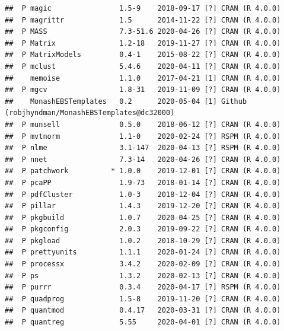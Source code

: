 \documentclass[11pt,a4paper,]{article}
\begin{document}
\begin{verbatim}
##  P magic                1.5-9    2018-09-17 [?] CRAN (R 4.0.0)                                 
##  P magrittr             1.5      2014-11-22 [?] CRAN (R 4.0.0)                                 
##  P MASS                 7.3-51.6 2020-04-26 [?] CRAN (R 4.0.0)                                 
##  P Matrix               1.2-18   2019-11-27 [?] CRAN (R 4.0.0)                                 
##  P MatrixModels         0.4-1    2015-08-22 [?] CRAN (R 4.0.0)                                 
##  P mclust               5.4.6    2020-04-11 [?] CRAN (R 4.0.0)                                 
##    memoise              1.1.0    2017-04-21 [1] CRAN (R 4.0.0)                                 
##  P mgcv                 1.8-31   2019-11-09 [?] CRAN (R 4.0.0)                                 
##    MonashEBSTemplates   0.2      2020-05-04 [1] Github (robjhyndman/MonashEBSTemplates@dc32000)
##  P munsell              0.5.0    2018-06-12 [?] CRAN (R 4.0.0)                                 
##  P mvtnorm              1.1-0    2020-02-24 [?] RSPM (R 4.0.0)                                 
##  P nlme                 3.1-147  2020-04-13 [?] RSPM (R 4.0.0)                                 
##  P nnet                 7.3-14   2020-04-26 [?] CRAN (R 4.0.0)                                 
##  P patchwork          * 1.0.0    2019-12-01 [?] CRAN (R 4.0.0)                                 
##  P pcaPP                1.9-73   2018-01-14 [?] CRAN (R 4.0.0)                                 
##  P pdfCluster           1.0-3    2018-12-04 [?] CRAN (R 4.0.0)                                 
##  P pillar               1.4.3    2019-12-20 [?] CRAN (R 4.0.0)                                 
##  P pkgbuild             1.0.7    2020-04-25 [?] CRAN (R 4.0.0)                                 
##  P pkgconfig            2.0.3    2019-09-22 [?] CRAN (R 4.0.0)                                 
##  P pkgload              1.0.2    2018-10-29 [?] CRAN (R 4.0.0)                                 
##  P prettyunits          1.1.1    2020-01-24 [?] CRAN (R 4.0.0)                                 
##  P processx             3.4.2    2020-02-09 [?] CRAN (R 4.0.0)                                 
##  P ps                   1.3.2    2020-02-13 [?] CRAN (R 4.0.0)                                 
##  P purrr                0.3.4    2020-04-17 [?] RSPM (R 4.0.0)                                 
##  P quadprog             1.5-8    2019-11-20 [?] CRAN (R 4.0.0)                                 
##  P quantmod             0.4.17   2020-03-31 [?] CRAN (R 4.0.0)                                 
##  P quantreg             5.55     2020-04-01 [?] CRAN (R 4.0.0)                                 

\end{verbatim}
\end{document}
